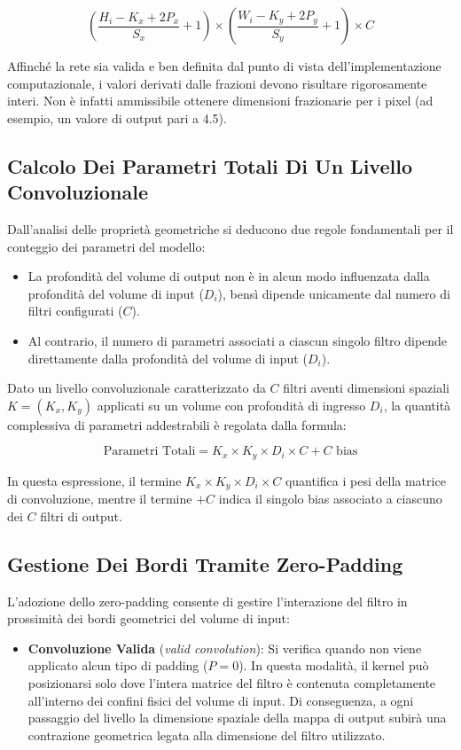﻿\documentclass[11pt, a4paper]{article}
\begin{document}
\[
\boxed{\left( \frac{H_i - K_x + 2P_x}{S_x} + 1 \right) \times \left( \frac{W_i - K_y + 2P_y}{S_y} + 1 \right) \times C}
\]

Affinché la rete sia valida e ben definita dal punto di vista dell'implementazione computazionale, i valori derivati dalle frazioni devono risultare rigorosamente interi. Non è infatti ammissibile ottenere dimensioni frazionarie per i pixel (ad esempio, un valore di output pari a 4.5).

\subsection{Calcolo Dei Parametri Totali Di Un Livello Convoluzionale}

Dall'analisi delle proprietà geometriche si deducono due regole fondamentali per il conteggio dei parametri del modello:
\begin{itemize}
    \item La profondità del volume di output non è in alcun modo influenzata dalla profondità del volume di input ($D_i$), bensì dipende unicamente dal numero di filtri configurati ($C$).
    \item Al contrario, il numero di parametri associati a ciascun singolo filtro dipende direttamente dalla profondità del volume di input ($D_i$).
\end{itemize}

Dato un livello convoluzionale caratterizzato da $C$ filtri aventi dimensioni spaziali $K = (K_x, K_y)$ applicati su un volume con profondità di ingresso $D_i$, la quantità complessiva di parametri addestrabili è regolata dalla formula:

\[
\boxed{\text{Parametri Totali} = K_x \times K_y \times D_i \times C + C \text{ bias}}
\]

In questa espressione, il termine $K_x \times K_y \times D_i \times C$ quantifica i pesi della matrice di convoluzione, mentre il termine $+C$ indica il singolo bias associato a ciascuno dei $C$ filtri di output.

\subsection{Gestione Dei Bordi Tramite Zero-Padding}

L'adozione dello zero-padding consente di gestire l'interazione del filtro in prossimità dei bordi geometrici del volume di input:
\begin{itemize}
    \item \textbf{Convoluzione Valida} (\emph{valid convolution}): Si verifica quando non viene applicato alcun tipo di padding ($P = 0$). In questa modalità, il kernel può posizionarsi solo dove l'intera matrice del filtro è contenuta completamente all'interno dei confini fisici del volume di input. Di conseguenza, a ogni passaggio del livello la dimensione spaziale della mappa di output subirà una contrazione geometrica legata alla dimensione del filtro utilizzato.
\end{itemize}
\end{document}
